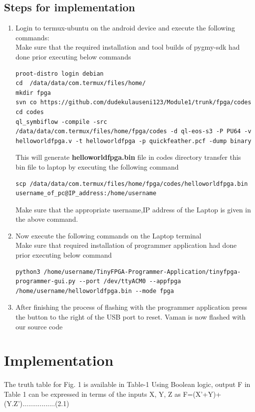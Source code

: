 \documentclass[10pt, a4paper]{article}
\begin{document}
\subsection{Steps for implementation}
\begin{enumerate}
\item Login to termux-ubuntu on the android device and execute the following commands:\\
Make sure that the required installation and tool builds of pygmy-sdk had done prior executing below commands
\begin{lstlisting}
proot-distro login debian
cd  /data/data/com.termux/files/home/
mkdir fpga
svn co https://github.com/dudekulauseni123/Module1/trunk/fpga/codes
cd codes
ql_symbiflow -compile -src /data/data/com.termux/files/home/fpga/codes -d ql-eos-s3 -P PU64 -v helloworldfpga.v -t helloworldfpga -p quickfeather.pcf -dump binary
\end{lstlisting}
This will generate \textbf{helloworldfpga.bin} file in codes directory transfer this bin file to laptop by executing the following command
\begin{lstlisting}
scp /data/data/com.termux/files/home/fpga/codes/helloworldfpga.bin username_of_pc@IP_address:/home/username
\end{lstlisting}
Make sure that the appropriate username,IP address of the Laptop is given in the above command.
\item Now execute the following commands on the Laptop terminal\\
Make sure that required installation of programmer application had done prior executing below command
\begin{lstlisting}
python3 /home/username/TinyFPGA-Programmer-Application/tinyfpga-programmer-gui.py --port /dev/ttyACM0 --appfpga /home/username/helloworldfpga.bin --mode fpga
\end{lstlisting}
\item After finishing the process of flashing with the programmer application press the button to the right of the USB port to reset. Vaman is now flashed with our source code
\end{enumerate}
\section{Implementation}
   	\paragraph{}
The truth table  for Fig. 1 is available in Table-1
Using Boolean logic, output F in Table 1 can be expressed in terms of the inputs X, Y, Z as F=(X'+Y)+(Y.Z').................(2.1)
\end{document}
